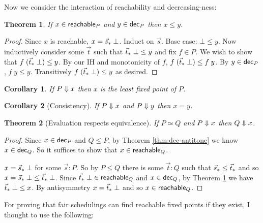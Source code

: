 \documentclass{article}
\newcommand{\todo}[1]{{\color{red}{#1}}}
\newtheorem{theorem}{Theorem}
\newtheorem{corollary}{Corollary}
\begin{document}
Now we consider the interaction of reachability and decreasing-ness:

\begin{theorem}
  If $x \in \textsf{{reachable}}_{P}$ and $y \in \textsf{{dec}}_{P}$ then $x \le y$.
  \label{thm:reachable<=dec}
\end{theorem}

\begin{proof}
  Since $x$ is reachable, $x = {\vec{s}_*}\; \bot$. Induct on $\vec{s}$. Base case:
  $\bot \le y$. Now inductively consider some $\vec{t}$ such that ${\vec{t}_*}\;
  \bot \le y$ and fix $f \in P$. We wish to show that $f\; ({\vec{t}_*}\; \bot) \le
  y$. By our IH and monotonicity of $f$, $f\;({\vec{t}_*}\; \bot) \le f\; y$. By $y
  \in \textsf{{dec}}_{P}$, $f\;y \le y$. Transitively $f\; ({\vec{t}_*}\; \bot) \le y$ as
  desired.
\end{proof}

\begin{corollary}
  If $P \Downarrow x$ then $x$ is the least fixed point of $P$.
\end{corollary}

\begin{corollary}[Consistency]
  If $P \Downarrow x$ and $P \Downarrow y$ then $x = y$.
  \label{cor:consistency}
\end{corollary}

\todo{Couldn't I prove a perhaps more traditional ``confluence''-style theorem
  as well?}

\begin{theorem}[Evaluation respects equivalence]
  If $P \simeq Q$ and $P \Downarrow x$ then $Q \Downarrow x$.
  \label{thm:equivalence}
\end{theorem}

\begin{proof}
  Since $x \in \textsf{{dec}}_{P}$ and $Q \le P$, by Theorem \ref{thm:dec-antitone} we know
  $x \in \textsf{{dec}}_{Q}$. So it suffices to show that $x \in \textsf{{reachable}}_{Q}$.

  $x = {\vec{s}_*}\;\bot$ for some $\vec{s} : P$. So by $P \le Q$ there is some
  $\vec{t} : Q$ such that ${\vec{s}_*} \le {\vec{t}_*}$ and so $x = {\vec{s}_*}\; \bot \le
  {\vec{t}_*}\;\bot$. Since ${\vec{t}_*}\;\bot \in \textsf{{reachable}}_{Q}$ and $x \in \textsf{{dec}}_{Q}$, by
  Theorem \ref{thm:reachable<=dec} we have ${\vec{t}_*}\;\bot \le x$. By
  antisymmetry $x = {\vec{t}_*}\;\bot$ and so $x \in \textsf{{reachable}}_{Q}$.
\end{proof}

For proving that fair schedulings can find reachable fixed points if they exist,
I thought to use the following:
\end{document}
